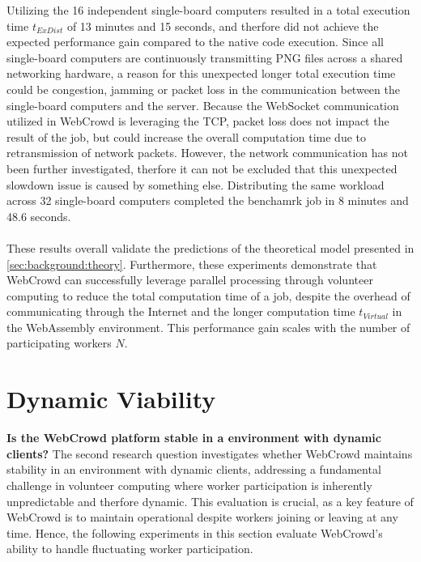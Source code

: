 Utilizing the 16 independent single-board computers resulted in a total execution time $t_{ExDist}$ of 13 minutes and 15 seconds, and therfore did not achieve the expected performance gain compared to the native code execution. Since all single-board computers are continuously transmitting \ac{PNG} files across a shared networking hardware, a reason for this unexpected longer total execution time could be congestion, jamming or packet loss in the communication between the single-board computers and the server. Because the WebSocket communication utilized in WebCrowd is leveraging the \ac{TCP}, packet loss does not impact the result of the job, but could increase the overall computation time due to retransmission of network packets. However, the network communication has not been further investigated, therfore it can not be excluded that this unexpected slowdown issue is caused by something else. Distributing the same workload across 32 single-board computers completed the benchamrk job in 8 minutes and 48.6 seconds.
\\~\\
These results overall validate the predictions of the theoretical model presented in \autoref{sec:background:theory}. Furthermore, these experiments demonstrate that WebCrowd can successfully leverage parallel processing through volunteer computing to reduce the total computation time of a job, despite the overhead of communicating through the Internet and the longer computation time $t_{Virtual}$ in the WebAssembly environment. This performance gain scales with the number of participating workers $N$.

\section{Dynamic Viability}
\label{sec:evaluation:dynamic}
\textbf{Is the WebCrowd platform stable in a environment with dynamic clients?}
\newline
The second research question investigates whether WebCrowd maintains stability in an environment with dynamic clients, addressing a fundamental challenge in volunteer computing where worker participation is inherently unpredictable and therfore dynamic. This evaluation is crucial, as a key feature of WebCrowd is to maintain operational despite workers joining or leaving at any time. Hence, the following experiments in this section evaluate WebCrowd's ability to handle fluctuating worker participation.

